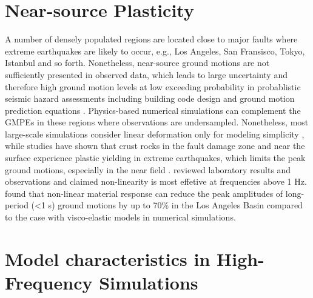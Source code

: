 \section{Near-source Plasticity}

A number of densely populated regions are located close to major faults where extreme earthquakes are likely to occur, e.g., Los Angeles, San Fransisco, Tokyo, Istanbul and so forth. Nonetheless, near-source ground motions are not sufficiently presented in observed data, which leads to large uncertainty and therefore high ground motion levels at low exceeding probability in probablistic seismic hazard assessments including building code design and ground motion prediction equations . Physics-based numerical simulations can complement the GMPEs in these regions where observations are undersampled. Nonetheless, most large-scale simulations consider linear deformation only for modeling simplicity \citep{olsen20083d,molnar2014earthquake}, while studies have shown that crust rocks in the fault damage zone and near the surface experience plastic yielding in extreme earthquakes, which limits the peak ground motions, especially in the near field \citep{andrewsPhysicalLimitsGround2007,ma2008physical,duanSensitivityStudyPhysical2010,templetonDynamicRuptureBranched2010,dunhamEarthquakeRupturesStrongly2011}. \citet{fieldNonlinearSiteResponse1998} reviewed laboratory results and observations and claimed non-linearity is most effetive at frequencies above 1 Hz. \citet{gravesBroadbandSimulationsSouthern2008} found that non-linear material response can reduce the peak amplitudes of long-period (<1 s) ground motions by up to 70\% in the Los Angeles Basin compared to the case with visco-elastic models in numerical simulations. 



\section{Model characteristics in High-Frequency Simulations}

